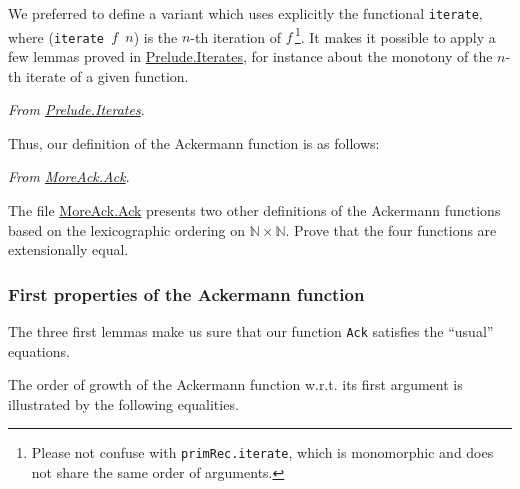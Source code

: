 We preferred to define a variant which uses explicitly
 the functional \texttt{iterate},
where (\texttt{iterate\,$f$\,$n$})
is the $n$-th iteration of $f$\,\footnote{Please not confuse with \texttt{primRec.iterate}, which is monomorphic and does not share the same order of arguments.}. It makes it possible to apply a few lemmas proved in 
\href{../theories/html/hydras.Prelude.Iterates.html}{Prelude.Iterates}, for instance about the monotony of the $n$-th iterate of a given function. 


\vspace{4pt}
\noindent
\emph{From \href{../theories/html/hydras.Prelude.Iterates.html}{Prelude.Iterates}}.






Thus, our definition of the Ackermann function is as follows:

\vspace{4pt}
\noindent
\emph{From \href{../theories/html/hydras.MoreAck.Ack.html}{MoreAck.Ack}}.





\begin{exercise}
The file \href{../theories/html/hydras.MoreAck.Ack.html}{MoreAck.Ack} presents two other definitions of the Ackermann functions based on the lexicographic ordering on $\mathbb{N}\times\mathbb{N}$.
Prove that the four functions are extensionally equal.
\end{exercise}


\subsubsection{First properties of the Ackermann function}

The three first lemmas make us sure that our function 
\texttt{Ack} satisfies the ``usual'' equations.




\vspace{4pt}

The order of growth of the Ackermann function w.r.t. its first argument is illustrated by the following equalities.







